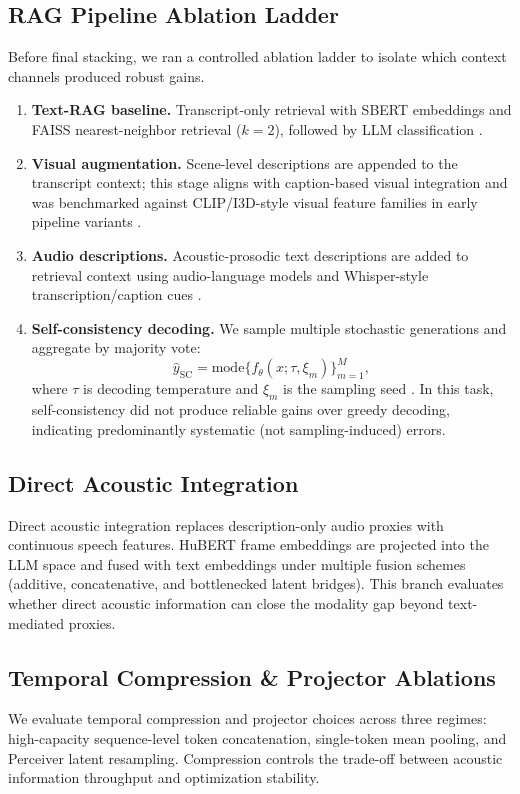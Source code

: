 \documentclass[11pt,a4paper,twocolumn]{article}
\begin{document}
\subsection{RAG Pipeline Ablation Ladder}
Before final stacking, we ran a controlled ablation ladder to isolate which context channels produced robust gains.
\begin{enumerate}
    \item \textbf{Text-RAG baseline.} Transcript-only retrieval with SBERT embeddings and FAISS nearest-neighbor retrieval ($k=2$), followed by LLM classification \cite{lewis2020rag,reimers2019sbert,johnson2019faiss}.
    \item \textbf{Visual augmentation.} Scene-level descriptions are appended to the transcript context; this stage aligns with caption-based visual integration and was benchmarked against CLIP/I3D-style visual feature families in early pipeline variants \cite{liu2023llava,radford2021clip,carreira2017i3d}.
    \item \textbf{Audio descriptions.} Acoustic-prosodic text descriptions are added to retrieval context using audio-language models and Whisper-style transcription/caption cues \cite{chu2024qwenaudio,radford2023whisper}.
    \item \textbf{Self-consistency decoding.} We sample multiple stochastic generations and aggregate by majority vote:
    \begin{equation}
    \hat{y}_{\mathrm{SC}} = \mathrm{mode}\{f_\theta(x;\tau,\xi_m)\}_{m=1}^{M},
    \end{equation}
    where $\tau$ is decoding temperature and $\xi_m$ is the sampling seed \cite{wang2023selfconsistency}. In this task, self-consistency did not produce reliable gains over greedy decoding, indicating predominantly systematic (not sampling-induced) errors.
\end{enumerate}

\subsection{Direct Acoustic Integration}
Direct acoustic integration replaces description-only audio proxies with continuous speech features. HuBERT frame embeddings are projected into the LLM space and fused with text embeddings under multiple fusion schemes (additive, concatenative, and bottlenecked latent bridges). This branch evaluates whether direct acoustic information can close the modality gap beyond text-mediated proxies.

\subsection{Temporal Compression \& Projector Ablations}
We evaluate temporal compression and projector choices across three regimes: high-capacity sequence-level token concatenation, single-token mean pooling, and Perceiver latent resampling. Compression controls the trade-off between acoustic information throughput and optimization stability.
\end{document}
